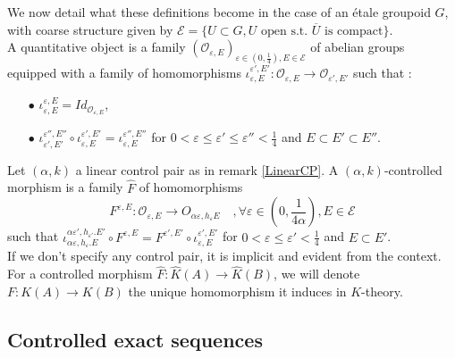 We now detail what these definitions become in the case of an étale groupoid $G$, with coarse structure given by $\mathcal E=\{U\subset G, U\text{ open s.t. }\overline U \text{ is compact}\}$.\\

A quantitative object is a family $(\mathcal O_{\varepsilon,E})_{\varepsilon\in (0,\frac{1}{4}),E\in\mathcal E}$ of abelian groups equipped with a family of homomorphisms $\iota_{\varepsilon,E}^{\varepsilon', E'}: \mathcal O_{\varepsilon,E}\rightarrow \mathcal O_{\varepsilon',E'}$ such that :
\begin{itemize}
\item[$\bullet$] $\iota_{\varepsilon,E}^{\varepsilon, E}=Id_{\mathcal O_{\varepsilon,E}}$,
\item[$\bullet$] $\iota_{\varepsilon',E'}^{\varepsilon'', E''}\circ \iota_{\varepsilon,E}^{\varepsilon', E'}= \iota_{\varepsilon,E}^{\varepsilon'', E''}$ for $0<\varepsilon \leq\varepsilon'\leq \varepsilon''<\frac{1}{4}$ and $E\subset E'\subset E''$.
\end{itemize}

Let $(\alpha,k)$ a linear control pair as in remark \ref{LinearCP}. A $(\alpha,k)$-controlled morphism is a family $\hat F$ of homomorphisms
\[F^{\varepsilon,E} :\mathcal O_{\varepsilon,E}\rightarrow O_{\alpha\varepsilon,h_\varepsilon E} \quad, \forall \varepsilon\in(0,\frac{1}{4\alpha}),E\in\mathcal E \]
such that $\iota_{\alpha\varepsilon,h_\varepsilon. E}^{\alpha\varepsilon',h_{\varepsilon'}. E'}\circ F^{\varepsilon,E} = F^{\varepsilon',E'}\circ\iota_{\varepsilon,E}^{\varepsilon',E'}$ for $0<\varepsilon \leq\varepsilon'<\frac{1}{4}$ and $E\subset E'$.\\

If we don't specify any control pair, it is implicit and evident from the context. For a controlled morphism $\hat F : \hat K(A)\rightarrow \hat K(B)$, we will denote $F:K(A)\rightarrow K(B)$ the unique homomorphism it induces in $K$-theory.\\
\subsection{Controlled exact sequences}

